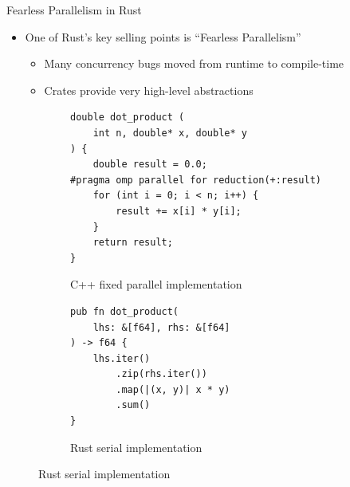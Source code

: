 \documentclass[10pt,aspectratio=169]{beamer}
\begin{document}
\begin{frame}[fragile]{Fearless Parallelism in Rust}
    \begin{itemize}
        \item One of Rust's key selling points is ``Fearless Parallelism''
        \begin{itemize}
            \item Many concurrency bugs moved from runtime to compile-time
            \item Crates provide very high-level abstractions
        \end{itemize}
    \end{itemize}    
    \vspace*{0.15cm}

    \begin{figure}
        \begin{subfigure}[c]{.55\textwidth}\centering
            \begin{verbatim}
double dot_product (
    int n, double* x, double* y
) {
    double result = 0.0;
#pragma omp parallel for reduction(+:result)
    for (int i = 0; i < n; i++) {
        result += x[i] * y[i];
    }
    return result;
}
            \end{verbatim}
            \label{fig:cpp-ddot-openmp-reduction}
            \vspace*{-0.5cm}
            \caption{C++ fixed parallel implementation}
        \end{subfigure}%
        \begin{subfigure}[c]{.45\textwidth}\centering
            \begin{verbatim}
pub fn dot_product(
    lhs: &[f64], rhs: &[f64]
) -> f64 {
    lhs.iter()
        .zip(rhs.iter())
        .map(|(x, y)| x * y)
        .sum()
}
            \end{verbatim}
            \label{fig:rust-ddot-serial-3}
            \vspace*{1.15cm}
            \caption{Rust serial implementation}
        \end{subfigure}
    \end{figure}
\end{frame}
\end{document}
